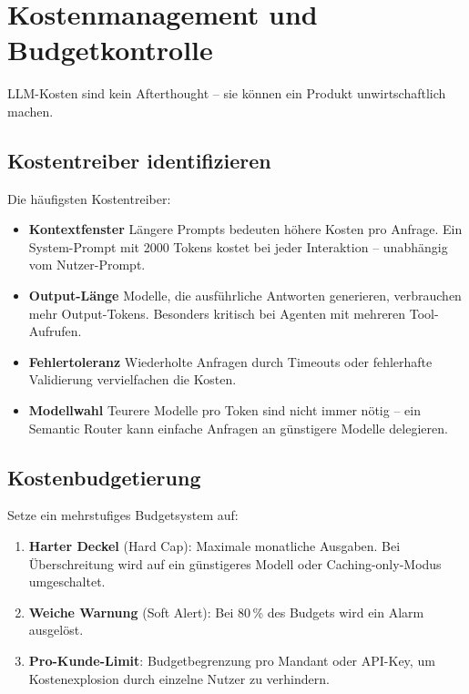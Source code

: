 \section{Kostenmanagement und Budgetkontrolle}

LLM-Kosten sind kein Afterthought -- sie können ein Produkt unwirtschaftlich machen.

\subsection{Kostentreiber identifizieren}

Die häufigsten Kostentreiber:

\begin{itemize}

    \item \textbf{Kontextfenster} Längere Prompts bedeuten höhere Kosten pro Anfrage. Ein System-Prompt mit 2000 Tokens kostet bei jeder Interaktion -- unabhängig vom Nutzer-Prompt.
    \item \textbf{Output-Länge} Modelle, die ausführliche Antworten generieren, verbrauchen mehr Output-Tokens. Besonders kritisch bei Agenten mit mehreren Tool-Aufrufen.
    \item \textbf{Fehlertoleranz} Wiederholte Anfragen durch Timeouts oder fehlerhafte Validierung vervielfachen die Kosten.
    \item \textbf{Modellwahl} Teurere Modelle pro Token sind nicht immer nötig -- ein Semantic Router kann einfache Anfragen an günstigere Modelle delegieren.
\end{itemize}

\subsection{Kostenbudgetierung}

Setze ein mehrstufiges Budgetsystem auf:

\begin{enumerate}[leftmargin=*]
    \item \textbf{Harter Deckel} (Hard Cap): Maximale monatliche Ausgaben. Bei Überschreitung wird auf ein günstigeres Modell oder Caching-only-Modus umgeschaltet.
    \item \textbf{Weiche Warnung} (Soft Alert): Bei 80\,\% des Budgets wird ein Alarm ausgelöst.
    \item \textbf{Pro-Kunde-Limit}: Budgetbegrenzung pro Mandant oder API-Key, um Kostenexplosion durch einzelne Nutzer zu verhindern.
\end{enumerate}

